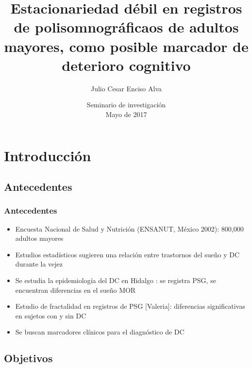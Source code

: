 \documentclass{beamer}
\title[Estacionariedad en PSG de adultos mayores]
{Estacionariedad d\'ebil en registros de polisomnogr\'aficaos de adultos mayores,
como posible marcador de deterioro cognitivo}
\author[Enciso Alva]
{Julio Cesar Enciso Alva}
\institute[LIMA]
{Licenciatura en Matem\'aticas Aplicadas}
\date[Mayo 2017]
{Seminario de investigaci\'on\\ Mayo de 2017}
\theoremstyle{definition}
\begin{document}
\frame{\titlepage}

\begin{frame}
\tableofcontents
\end{frame}


\section{Introducci\'on}


\subsection{Antecedentes}

\begin{frame}\frametitle{Antecedentes}
\begin{itemize}
\item Encuesta Nacional de Salud y Nutrici\'on (ENSANUT, M\'exico 2002): 800,000 adultos 
mayores\cite{PlanAlzheimer04}

\item Estudios estad\'isticos \cite{Amer13,Miyata13,Potvin12} sugieren una relaci\'on entre 
trastornos del sue\~no y DC durante la vejez

\item Se estudia la epidemiolog\'ia del DC en Hidalgo \cite{VazquezTagle16}: se registra PSG, se 
encuentran diferencias en el sue\~no MOR

\item Estudio de fractalidad en registros de PSG [Valeria]: diferencias significativas en sujetos 
con y sin DC 

\item Se buscan marcadores cl\'inicos para el diagn\'ostico de DC
\end{itemize}
\end{frame}


\subsection{Objetivos}
\end{document}
